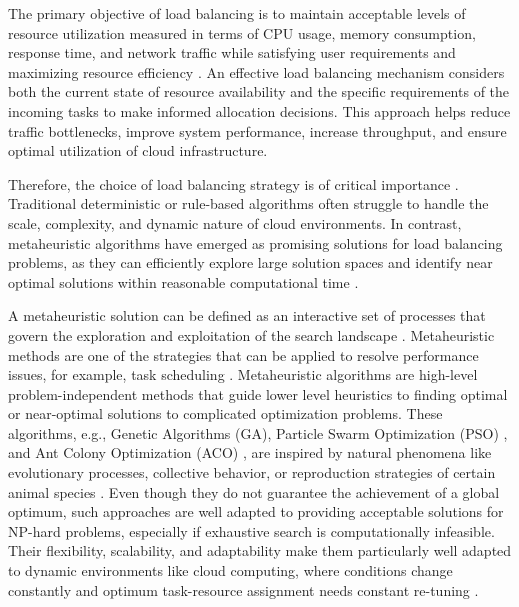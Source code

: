 \documentclass[pdflatex,sn-mathphys-num]{sn-jnl}%
\theoremstyle{thmstyleone}%
\theoremstyle{thmstyletwo}%
\theoremstyle{thmstylethree}%
\begin{document}
The primary objective of load balancing is to maintain acceptable levels of resource utilization measured in terms of CPU usage, memory consumption, response time, and network traffic while satisfying user requirements and maximizing resource efficiency \cite{loadBalancing3}. An effective load balancing mechanism considers both the current state of resource availability and the specific requirements of the incoming tasks to make informed allocation decisions. This approach helps reduce traffic bottlenecks, improve system performance, increase throughput, and ensure optimal utilization of cloud infrastructure.

Therefore, the choice of load balancing strategy is of critical importance \cite{loadBalancing2}. Traditional deterministic or rule-based algorithms often struggle to handle the scale, complexity, and dynamic nature of cloud environments. In contrast, metaheuristic algorithms have emerged as promising solutions for load balancing problems, as they can efficiently explore large solution spaces and identify near optimal solutions within reasonable computational time \cite{bib5}.

A metaheuristic solution can be defined as an interactive set of processes that govern the exploration and exploitation of the search landscape \cite{bib4, Blum2003}. Metaheuristic methods are one of the strategies that can be applied to resolve performance issues, for example, task scheduling \cite{bib7, Li2018}. Metaheuristic algorithms are high-level problem-independent methods that guide lower level heuristics to finding optimal or near-optimal solutions to complicated optimization problems. These algorithms, e.g., Genetic Algorithms (GA), Particle Swarm Optimization (PSO) \cite{Kennedy1995}, and Ant Colony Optimization (ACO) \cite{Dorigo1992}, are inspired by natural phenomena like evolutionary processes, collective behavior, or reproduction strategies of certain animal species \cite{bib4, Yang2010}. Even though they do not guarantee the achievement of a global optimum, such approaches are well adapted to providing acceptable solutions for NP-hard problems, especially if exhaustive search is computationally infeasible. Their flexibility, scalability, and adaptability make them particularly well adapted to dynamic environments like cloud computing, where conditions change constantly and optimum task-resource assignment needs constant re-tuning \cite{Buyya2010}.
\end{document}
